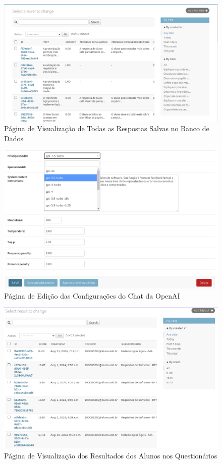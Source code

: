 \begin{figure}[H]
    \centering
    \includegraphics[width=1\textwidth]{figuras/admin1.png}
    \caption{Página de Visualização de Todas as Respostas Salvas no Banco de Dados}
    \label{fig:report_questions}
\end{figure}

\begin{figure}[H]
    \centering
    \includegraphics[width=1\textwidth]{figuras/admin2.png}
    \caption{Página de Edição das Configurações do Chat da OpenAI}
    \label{fig:report_questions}
\end{figure}

\begin{figure}[H]
    \centering
    \includegraphics[width=1\textwidth]{figuras/admin3.png}
    \caption{Página de Visualização dos Resultados dos Alunos nos Questionários}
    \label{fig:report_questions}
\end{figure}

